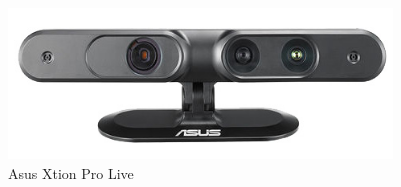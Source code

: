 \begin{figure}
	[h] \centering 
	\includegraphics[height=4cm]{figures/content/xtion.jpg} \caption{Asus Xtion Pro Live} \label{fg:xtion} 
\end{figure}
